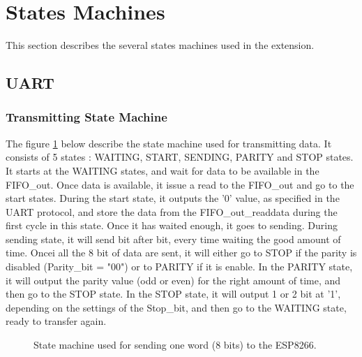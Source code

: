 \documentclass[11pt]{article}
\begin{document}
\section{States Machines}
This section describes the several states machines used in the extension.
\subsection{UART}
\subsubsection{Transmitting State Machine}
The figure \ref{UART_transmit_SM} below describe the state machine used for transmitting data. It consists of 5 states : WAITING, START, SENDING, PARITY and STOP states. It starts at the WAITING states, and wait for data to be available in the FIFO\_out. Once data is available, it issue a read to the FIFO\_out and go to the start states. During the start state, it outputs the '0' value, as specified in the UART protocol, and store the data from the FIFO\_out\_readdata during the first cycle in this state. Once it has waited enough, it goes to sending. During sending state, it will send bit after bit, every time waiting the good amount of time. Oncei all the 8 bit of data are sent, it will either go to STOP if the parity is disabled (Parity\_bit = "00") or to PARITY if it is enable. In the PARITY state, it will output the parity value (odd or even) for the right amount of time, and then go to the STOP state. In the STOP state, it will output 1 or 2 bit at '1', depending on the settings of the Stop\_bit, and then go to the WAITING state, ready to transfer again.
\begin{figure}[H]
    \center
    \caption{State machine used for sending one word (8 bits) to the ESP8266.}
    \label{UART_transmit_SM}
\end{figure}
\end{document}
